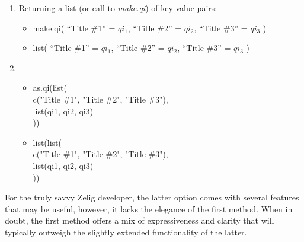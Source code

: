 \documentclass[a4paper, 11pt]{article}
\begin{document}
\begin{enumerate}
	\item{Returning a list (or call to \emph{make.qi}) of key-value pairs:
	\begin{itemize}
		\item{make.qi(	``Title \#1'' = $qi_1$,
						``Title \#2'' = $qi_2$,
						``Title \#3'' = $qi_3$
						)}
		\item{list(	``Title \#1'' = $qi_1$,
						``Title \#2'' = $qi_2$,
						``Title \#3'' = $qi_3$
						)}
	\end{itemize}}

	\item{
	\begin{itemize}
		\item{as.qi(list(\\
			c("Title \#1", "Title \#2", "Title \#3"),\\
			list(qi1, qi2, qi3) \\
						))}
		\item{list(list(\\
			c("Title \#1", "Title \#2", "Title \#3"),\\
			list(qi1, qi2, qi3) \\
						))}
	\end{itemize}}
\end{enumerate}

For the truly savvy Zelig developer, the latter option comes with several features that may be useful, however, it lacks the elegance of the first method.  When in doubt, the first method offers a mix of expressiveness and clarity that will typically outweigh the slightly extended functionality of the latter.
\end{document}
